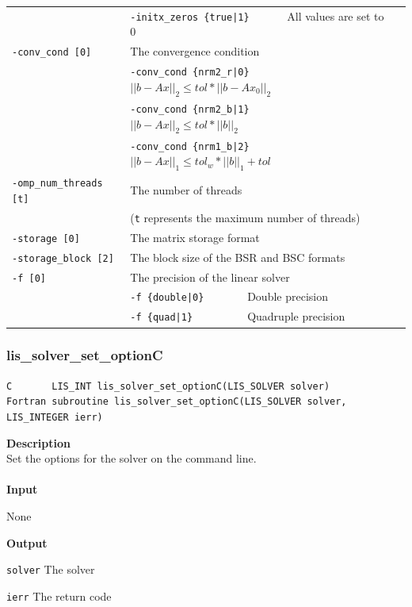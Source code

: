 \documentclass[a4paper]{article}
\newcommand{\namelistlabel}[1]{\mbox{#1}\hfill}
\newenvironment{namelist}[1]{%
\begin{list}{}
  {\let\makelabel\namelistlabel
  \settowidth{\labelwidth}{#1}
  \setlength{\leftmargin}{1.1\labelwidth}}
  }{%
\end{list}}
\begin{document}
\begin{minipage}[t]{\textwidth}
\begin{center}
\begin{tabular}{l|ll}
                       & \verb=-initx_zeros {true|1}      =  All values are set to $0$ \\
\verb=-conv_cond [0]= & The convergence condition  \\
                       & \verb=-conv_cond {nrm2_r|0}     =  $||b-Ax||_2 \le tol * ||b-Ax_0||_2$ \\
                       & \verb=-conv_cond {nrm2_b|1}     =  $||b-Ax||_2 \le tol * ||b||_2$ \\
                       & \verb=-conv_cond {nrm1_b|2}     =  $||b-Ax||_1 \le tol_w * ||b||_1 + tol$\\
\verb=-omp_num_threads [t]= & The number of threads        \\ 
                            & (\verb=t= represents the maximum number of
 threads) \\
\verb=-storage [0]=    & The matrix storage format \\
\verb=-storage_block [2]=& The block size of the BSR and BSC formats\\ 
\verb=-f [0]=          & The precision of the linear solver\\
                       & \verb=-f {double|0}       =  Double precision \\ 
                       & \verb=-f {quad|1}         =  Quadruple precision \\
\hline         
\end{tabular}
\end{center}
\end{minipage}

\newpage
\subsubsection{lis\_solver\_set\_optionC}
\begin{screen}
\verb|C       LIS_INT lis_solver_set_optionC(LIS_SOLVER solver)|\\
\verb|Fortran subroutine lis_solver_set_optionC(LIS_SOLVER solver, LIS_INTEGER ierr)|
\end{screen}
{\bf Description}\\
\indent
Set the options for the solver on the command line.
\\ \\
\noindent
{\bf Input}
\begin{namelist}{XXXXXXXXXXXXXXXXXXXX}
\item[None]
\end{namelist}
{\bf Output}
\begin{namelist}{XXXXXXXXXXXXXXXXXXXX}
\item[\tt solver] The solver
\item[\tt ierr] The return code
\end{namelist}
\end{document}
